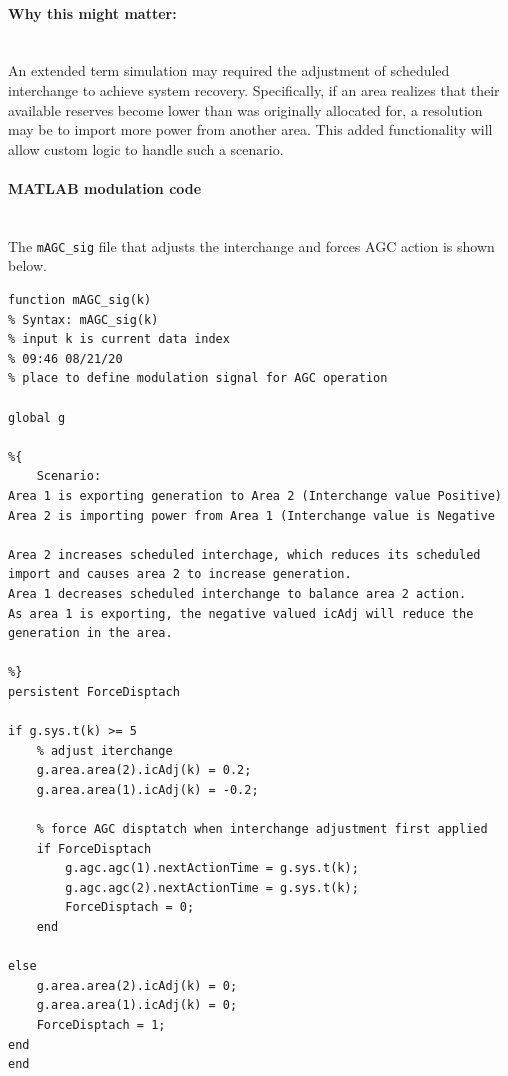 \documentclass[12pt]{article}
\begin{document}
\paragraph{Why this might matter: } \ \\
An extended term simulation may required the adjustment of scheduled interchange to achieve system recovery.
Specifically, if an area realizes that their available reserves become lower than was originally allocated for, a resolution may be to import more power from another area.
This added functionality will allow custom logic to handle such a scenario.

\pagebreak
\paragraph{MATLAB modulation code} \ \\
The \verb|mAGC_sig| file that adjusts the interchange and forces AGC action is shown below.

\begin{verbatim}
function mAGC_sig(k)
% Syntax: mAGC_sig(k)
% input k is current data index
% 09:46 08/21/20
% place to define modulation signal for AGC operation

global g

%{
    Scenario:
Area 1 is exporting generation to Area 2 (Interchange value Positive)
Area 2 is importing power from Area 1 (Interchange value is Negative

Area 2 increases scheduled interchage, which reduces its scheduled import and causes area 2 to increase generation.
Area 1 decreases scheduled interchange to balance area 2 action.
As area 1 is exporting, the negative valued icAdj will reduce the generation in the area.

%}
persistent ForceDisptach

if g.sys.t(k) >= 5
    % adjust iterchange 
    g.area.area(2).icAdj(k) = 0.2;
    g.area.area(1).icAdj(k) = -0.2;
    
    % force AGC disptatch when interchange adjustment first applied
    if ForceDisptach
        g.agc.agc(1).nextActionTime = g.sys.t(k);
        g.agc.agc(2).nextActionTime = g.sys.t(k);
        ForceDisptach = 0;
    end
    
else
    g.area.area(2).icAdj(k) = 0;
    g.area.area(1).icAdj(k) = 0;
    ForceDisptach = 1;
end
end
\end{verbatim}
\end{document}
